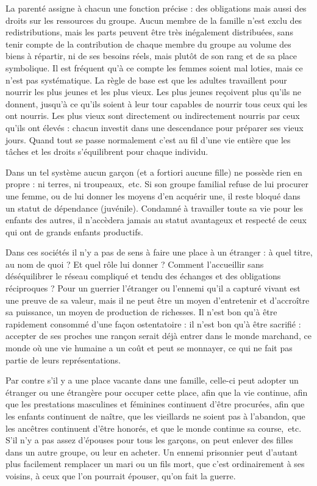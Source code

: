 La parenté assigne à chacun une fonction précise : des obligations 
mais aussi des droits sur les ressources du groupe. Aucun membre de la 
famille n'est exclu des redistributions, mais les parts peuvent être très 
inégalement distribuées, sans tenir compte de la contribution de chaque 
membre du groupe au volume des biens à répartir, ni de ses besoins
réels, mais plutôt de son rang et de sa place symbolique. Il est fréquent 
qu'à ce compte les femmes soient mal loties, mais ce n'est pas
systématique. La règle de base est que les adultes travaillent pour nourrir les plus 
jeunes et les plus vieux. Les plus jeunes reçoivent plus qu'ils ne donnent, 
jusqu'à ce qu'ils soient à leur tour capables de nourrir tous ceux qui les 
ont nourris. Les plus vieux sont directement ou indirectement nourris 
par ceux qu'ils ont élevés : chacun investit dans une descendance pour 
préparer ses vieux jours. Quand tout se passe normalement c'est au fil 
d'une vie entière que les tâches et les droits s'équilibrent pour chaque
individu.

Dans un tel système aucun garçon (et a fortiori aucune fille) ne 
possède rien en propre : ni terres, ni troupeaux,~etc. Si son groupe familial refuse de 
lui procurer une femme, ou de lui donner les moyens d'en acquérir une, 
il reste bloqué dans un statut de dépendance (juvénile). Condamné à
travailler toute sa vie pour les enfants des autres, il n'accèdera jamais au
statut avantageux et respecté de ceux qui ont de grands enfants productifs.

Dans ces sociétés il n'y a pas de sens à faire une place à un
étranger : à quel titre, au nom de quoi ? Et quel rôle lui donner ? Comment 
l'accueillir sans déséquilibrer le réseau compliqué et tendu des échanges 
et des obligations réciproques ? Pour un guerrier l'étranger ou l'ennemi qu'il a
capturé vivant est une preuve de sa valeur, mais il ne peut être un moyen 
d'entretenir et d'accroître sa puissance, un moyen de production de
richesses. Il n'est bon qu'à être rapidement consommé d'une façon
ostentatoire : il n'est bon qu'à être sacrifié : accepter de ses proches une
rançon serait déjà entrer dans le monde marchand, ce monde où une vie humaine a un 
coût et peut se monnayer, ce qui ne fait pas partie de leurs représentations.

Par contre s'il y a une place vacante dans une famille, celle-ci peut 
adopter un étranger ou une étrangère pour occuper cette place, afin que 
la vie continue, afin que les prestations masculines et féminines
continuent d'être procurées, afin que les enfants continuent de naître, que les 
vieillards ne soient pas à l'abandon, que les ancêtres continuent d'être 
honorés, et que le monde continue sa course,~etc. S'il n'y a pas assez 
d'épouses pour tous les garçons, on peut enlever des filles dans un autre 
groupe, ou leur en acheter. Un ennemi prisonnier peut d'autant plus 
facilement remplacer un mari ou un fils mort, que c'est ordinairement à ses 
voisins, à ceux que l'on pourrait épouser, qu'on fait la guerre.

